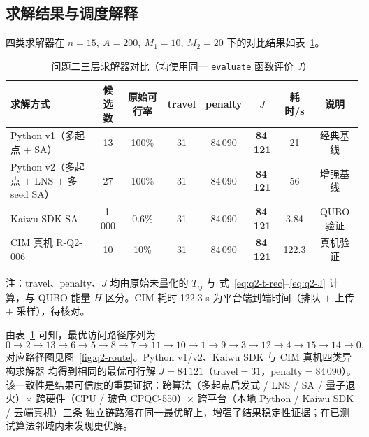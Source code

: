 \documentclass[UTF8,12pt,a4paper]{ctexart}
\begin{document}
\subsection{求解结果与调度解释}
\label{subsec:q2-result}

四类求解器在 $n=15,\ A=200,\ M_1=10,\ M_2=20$ 下的对比结果如表~\ref{tab:q2-cmp}。

\begin{table}[H]
  \centering
  \caption{问题二三层求解器对比（均使用同一 \texttt{evaluate} 函数评价 $J$）}
  \label{tab:q2-cmp}
  \footnotesize
  \begin{tabular}{lccccccc}
    \toprule
    求解方式 & 候选数 & 原始可行率 & travel & penalty & $J$ & 耗时/s & 说明 \\
    \midrule
    Python v1（多起点 $+$ SA）       & 13    & 100\%  & 31 & 84\,090 & \textbf{84\,121} & 21    & 经典基线 \\
    Python v2（多起点 $+$ LNS $+$ 多 seed SA） & 27    & 100\%  & 31 & 84\,090 & \textbf{84\,121} & 56    & 增强基线 \\
    Kaiwu SDK SA                          & 1\,000 & 0.6\%  & 31 & 84\,090 & \textbf{84\,121} & 3.84  & QUBO 验证 \\
    CIM 真机 R-Q2-006                     & 10    & 10\%   & 31 & 84\,090 & \textbf{84\,121} & 122.3 & 真机验证 \\
    \bottomrule
  \end{tabular}
  \begin{flushleft}\footnotesize
  注：$\mathrm{travel}$、$\mathrm{penalty}$、$J$ 均由原始未量化的 $T_{ij}$ 与
  式~\eqref{eq:q2-t-rec}--\eqref{eq:q2-J} 计算，与 QUBO 能量 $H$ 区分。CIM 耗时
  122.3 s 为平台端到端时间（排队 $+$ 上传 $+$ 采样），待核对。
  \end{flushleft}
\end{table}

由表~\ref{tab:q2-cmp} 可知，最优访问路径序列为
\begin{equation}
\label{eq:q2-route}
0\to 2\to 13\to 6\to 5\to 8\to 7\to 11\to 10\to 1\to 9\to 3\to 12\to 4\to 15\to 14\to 0,
\end{equation}
对应路径图见图~\ref{fig:q2-route}。Python v1/v2、Kaiwu SDK 与 CIM 真机四类异构求解器
均得到相同的最优可行解 $J=84\,121$（$\mathrm{travel}=31$，$\mathrm{penalty}=84\,090$）。
该一致性是结果可信度的重要证据：跨算法（多起点启发式 / LNS / SA / 量子退火）$\times$
跨硬件（CPU / 玻色 CPQC-550）$\times$ 跨平台（本地 Python / Kaiwu SDK / 云端真机）三条
独立链路落在同一最优解上，增强了结果稳定性证据；在已测试算法邻域内未发现更优解。
\end{document}

